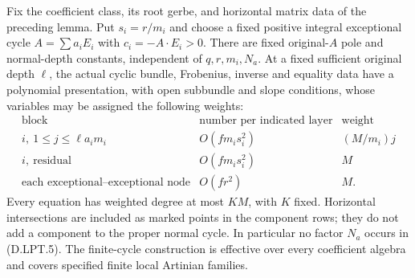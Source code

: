 \begin{proposition}
\label{D:local-pair-unbounded-horizontal-root-atlas}
Fix the coefficient class, its root gerbe, and horizontal matrix
data of the preceding lemma. Put $s_i=r/m_i$ and choose a fixed
positive integral exceptional cycle $A=\sum a_iE_i$ with
$c_i=-A\cdot E_i>0$. There are fixed original-$A$ pole and
normal-depth constants, independent of $q,r,m_i,N_a$.
At a fixed sufficient original depth $\ell$, the actual cyclic
bundle, Frobenius, inverse and equality data have a polynomial
presentation, with open subbundle and slope conditions, whose
variables may be assigned the following weights:
\[
\begin{array}{c|c|c}
\text{block}&\text{number per indicated layer}&\text{weight}\\ \hline
 i,\ 1\le j\le\ell a_i m_i&O(fm_i s_i^2)&(M/m_i)j\\
 i,\ \text{residual}&O(fm_i s_i^2)&M\\
 \text{each exceptional--exceptional node}&O(fr^2)&M.
\end{array}
 \tag{D.LPT.5}
\]
Every equation has weighted degree at most $KM$, with $K$ fixed.
Horizontal intersections are included as marked points in the
component rows; they do not add a component to the proper normal
cycle. In particular no factor $N_a$ occurs in (D.LPT.5).
The finite-cycle construction is effective over every coefficient
algebra and covers specified finite local Artinian families.
\end{proposition}

